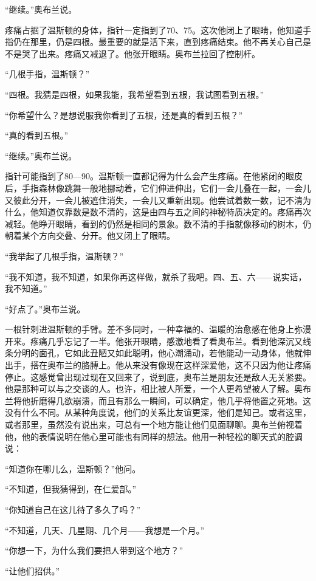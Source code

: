 ``继续。''奥布兰说。

疼痛占据了温斯顿的身体，指针一定指到了70、75。这次他闭上了眼睛，他知道手指仍在那里，仍是四根。最重要的就是活下来，直到疼痛结束。他不再关心自己是不是哭了出来。疼痛又减退了。他张开眼睛。奥布兰拉回了控制杆。

``几根手指，温斯顿？''

``四根。我猜是四根，如果我能，我希望看到五根，我试图看到五根。''

``你希望什么？是想说服我你看到了五根，还是真的看到五根？''

``真的看到五根。''

``继续。''奥布兰说。

指针可能指到了80---90。温斯顿一直都记得为什么会产生疼痛。在他紧闭的眼皮后，手指森林像跳舞一般地挪动着，它们伸进伸出，它们一会儿叠在一起，一会儿又彼此分开，一会儿被遮住消失，一会儿又重新出现。他尝试着数一数，记不清为什么，他知道仅靠数是数不清的，这是由四与五之间的神秘特质决定的。疼痛再次减轻。他睁开眼睛，看到的仍然是相同的景象。数不清的手指就像移动的树木，仍朝着某个方向交叠、分开。他又闭上了眼睛。

``我举起了几根手指，温斯顿？''

``我不知道，我不知道，如果你再这样做，就杀了我吧。四、五、六------说实话，我不知道。''

``好点了。''奥布兰说。

一根针刺进温斯顿的手臂。差不多同时，一种幸福的、温暖的治愈感在他身上弥漫开来。疼痛几乎忘记了一半。他张开眼睛，感激地看了看奥布兰。看到他深沉又线条分明的面孔，它如此丑陋又如此聪明，他心潮涌动，若他能动一动身体，他就伸出手，搭在奥布兰的胳膊上。他从来没有像现在这样深爱他，这不只因为他让疼痛停止。这感觉曾出现过现在又回来了，说到底，奥布兰是朋友还是敌人无关紧要。他是那种可以与之交谈的人。也许，相比被人所爱，一个人更希望被人了解。奥布兰将他折磨得几欲崩溃，而且有那么一瞬间，可以确定，他几乎将他置之死地。这没有什么不同。从某种角度说，他们的关系比友谊更深，他们是知己。或者这里，或者那里，虽然没有说出来，可总有一个地方能让他们见面聊聊。奥布兰俯视着他，他的表情说明在他心里可能也有同样的想法。他用一种轻松的聊天式的腔调说：

``知道你在哪儿么，温斯顿？''他问。

``不知道，但我猜得到，在仁爱部。''

``你知道自己在这儿待了多久了吗？''

``不知道，几天、几星期、几个月------我想是一个月。''

``你想一下，为什么我们要把人带到这个地方？''

``让他们招供。''

